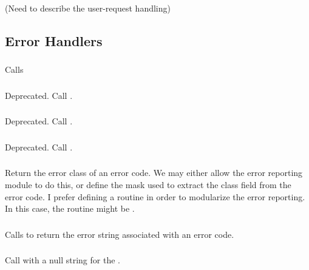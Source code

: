 \documentclass{article}
\begin{document}
(Need to describe the user-request handling)

\subsection{Error Handlers}
\label{sec:errhand}

\subsubsection{}
Calls 

\subsubsection{}
Deprecated.  Call .

\subsubsection{}
Deprecated.  Call .

\subsubsection{}
Deprecated.  Call .

\subsubsection{}
Return the error class of an error code.  We may either allow the
error reporting module to do this, or define the mask used to extract
the class field from the error code.  I prefer defining a routine in
order to modularize the error reporting.  In this case, the routine
might be .

\subsubsection{}
Calls  to return the error string
associated with an error code. 

\subsubsection{}
Call  with a null string for the
. 
\end{document}

